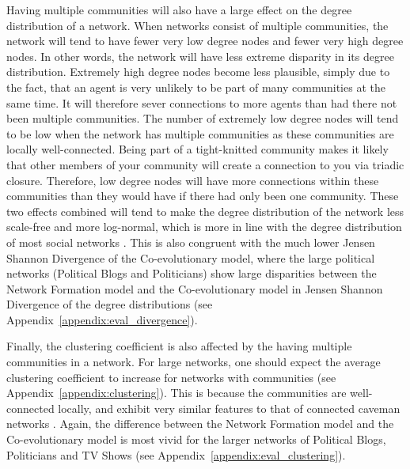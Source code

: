 \documentclass[11pt]{article}
\begin{document}
Having multiple communities will also have a large effect on the degree distribution of a network. When networks consist of multiple communities, the network will tend to have fewer very low degree nodes and fewer very high degree nodes. 
In other words, the network will have less extreme disparity in its degree distribution. 
Extremely high degree nodes become less plausible, simply due to the fact, that an agent is very unlikely to be part of many communities at the same time. 
It will therefore sever connections to more agents than had there not been multiple communities. 
The number of extremely low degree nodes will tend to be low when the network has multiple communities as these communities are locally well-connected. Being part of a tight-knitted community makes it likely that other members of your community will create a connection to you via triadic closure. Therefore, low degree nodes will have more connections within these communities than they would have if there had only been one community. 
These two effects combined will tend to make the degree distribution of the network less scale-free and more log-normal, which is more in line with the degree distribution of most social networks \cite{broido_scale-free_2019}. This is also congruent with the much lower Jensen Shannon Divergence of the Co-evolutionary model, where the large political networks (Political Blogs and Politicians) show large disparities between the Network Formation model and the Co-evolutionary model in Jensen Shannon Divergence of the degree distributions (see Appendix~\ref{appendix:eval_divergence}).

Finally, the clustering coefficient is also affected by the having multiple communities in a network. 
For large networks, one should expect the average clustering coefficient to increase for networks with communities (see Appendix~\ref{appendix:clustering}). 
This is because the communities are well-connected locally, and exhibit very similar features to that of connected caveman networks \cite{watts_networks_1999}. 
Again, the difference between the Network Formation model and the Co-evolutionary model is most vivid for the larger networks of Political Blogs, Politicians and TV Shows (see Appendix~\ref{appendix:eval_clustering}).
\end{document}
